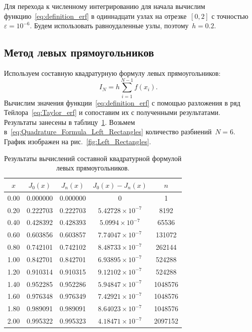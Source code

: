 \documentclass[a4paper, 14pt]{extarticle}
\begin{document}
    Для перехода к численному интегрированию для начала
    вычислим функцию~\eqref{eq:definition_erf} в одиннадцати узлах на отрезке~$[0,2]$ с точностью~$\varepsilon = 10^{-6}$.
    Будем использовать равноудаленные узлы, поэтому~$h=0.2$.

    \subsection{Метод левых прямоугольников}\label{subsec:left}
    Используем составную квадратурную формулу левых прямоугольников:
    \begin{equation}
        \label{eq:Quadrature_Formula_Left_Rectangles}
        I_{N} = h \sum\limits_{i=1}^{N - 1} f(x_i).
    \end{equation}
    Вычислим значения функции~\eqref{eq:definition_erf} с помощью разложения в ряд Тейлора~\eqref{eq:Taylor_erf}
    и сопоставим их с полученными результатами.
    Результаты занесены в таблицу~\ref{tab:Left_Rectangles}.
    Возьмем в~\eqref{eq:Quadrature_Formula_Left_Rectangles} количество разбиений~$N=6$.
    График изображен на рис.~\ref{fig:Left_Rectangles}.
    \begin{table}[H]
        \centering
        \begin{tabular}{|c|c|c|c|c|}
            \hline
            $x$  & $J_0(x)$ & $J_n(x)$ & $J_0(x)-J_n(x)$        & $n$     \\ \hline
            0.00 & 0.000000 & 0.000000 & 0                      & 1       \\ \hline
            0.20 & 0.222703 & 0.222703 & $5.42728\times10^{-7}$ & 8192    \\ \hline
            0.40 & 0.428392 & 0.428393 & $5.0994\times10^{-7}$  & 65536   \\ \hline
            0.60 & 0.603856 & 0.603857 & $7.74047\times10^{-7}$ & 131072  \\ \hline
            0.80 & 0.742101 & 0.742102 & $8.48733\times10^{-7}$ & 262144  \\ \hline
            1.00 & 0.842701 & 0.842701 & $6.93895\times10^{-7}$ & 524288  \\ \hline
            1.20 & 0.910314 & 0.910315 & $9.12102\times10^{-7}$ & 524288  \\ \hline
            1.40 & 0.952285 & 0.952286 & $5.94847\times10^{-7}$ & 1048576 \\ \hline
            1.60 & 0.976348 & 0.976349 & $7.42921\times10^{-7}$ & 1048576 \\ \hline
            1.80 & 0.989091 & 0.989091 & $8.64023\times10^{-7}$ & 1048576 \\ \hline
            2.00 & 0.995322 & 0.995323 & $4.18471\times10^{-7}$ & 2097152 \\ \hline
        \end{tabular}
        \caption{Результаты вычислений составной квадратурной формулой левых прямоугольников.}
        \label{tab:Left_Rectangles}
    \end{table}
\end{document}
